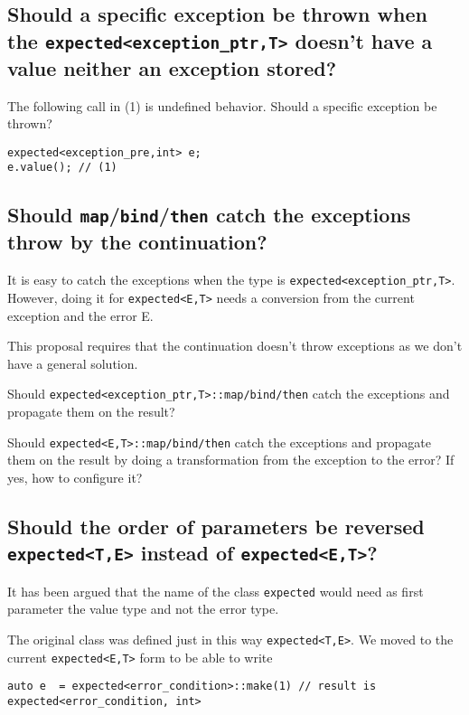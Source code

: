 \documentclass[a4paper,10pt]{article}
\newcommand{\cpp}[1]{\lstinline{#1}}
\begin{document}
\subsection{Should a specific exception be thrown when the \cpp{expected<exception_ptr,T>} doesn't have a value neither an exception stored?}

The following call in (1) is undefined behavior. Should a specific exception be thrown?

\begin{lstlisting}
expected<exception_pre,int> e;
e.value(); // (1)
\end{lstlisting}

\subsection{Should \cpp{map}/\cpp{bind}/\cpp{then} catch the exceptions throw by the continuation?}

It is easy to catch the exceptions when the type is \cpp{expected<exception_ptr,T>}. However, doing it for \cpp{expected<E,T>} needs a conversion from the current exception and the error E.

This proposal requires that the continuation doesn't throw exceptions as we don't have a general solution.

Should  \cpp{expected<exception_ptr,T>::map/bind/then} catch the exceptions and propagate them on the result?

Should  \cpp{expected<E,T>::map/bind/then} catch the exceptions and propagate them on the result by doing a transformation from the exception to the error? If yes, how to configure it?

\subsection{Should the order of parameters be reversed \cpp{expected<T,E>} instead of \cpp{expected<E,T>}?}

It has been argued that the name of the class \cpp{expected} would need as first parameter the value type and not the error type.

The original class was defined just in this way \cpp{expected<T,E>}. We moved to the current \cpp{expected<E,T>} form to be able to write

\begin{lstlisting}
auto e  = expected<error_condition>::make(1) // result is expected<error_condition, int>
\end{lstlisting}
\end{document}
